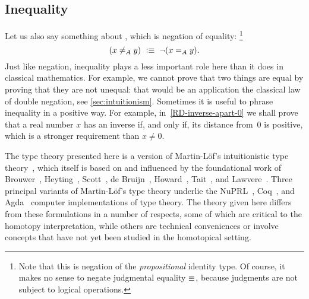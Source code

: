 \subsection{Inequality}

Let us also say something about , which is negation of equality:%
\footnote{Note that this is negation of the \emph{propositional} identity type.
Of course, it makes no sense to negate judgmental equality $\equiv$, because judgments are not subject to logical operations.}
%
\begin{equation*}
  (x \neq_A y) \ \vcentcolon\equiv\ \lnot (x =_A y).
\end{equation*}
%
Just like negation, inequality plays a less important role here than it does in classical
mathematics. For example, we cannot prove that two things are equal by proving that they
are not unequal: that would be an application the classical law of double negation, see \autoref{sec:intuitionism}.
Sometimes it is useful to phrase inequality in a positive way. For example,
in~\autoref{RD-inverse-apart-0} we shall prove that a real number $x$ has an inverse if,
and only if, its distance from~$0$ is positive, which is a stronger requirement than $x
\neq 0$.


\sectionNotes

The type theory presented here is a version of Martin-L\"{o}f's intuitionistic type theory~\cite{martinlof71itt,Martin-Lof-1972,Martin-Lof-1973,Martin-Lof-1979,martin-lof:bibliopolis}, which itself is based on and influenced by the foundational work of Brouwer~\cite{beeson}, Heyting~\cite{heyting1966intuitionism}, Scott~\cite{scott70}, de Bruijn~\cite{deBruijn-1973}, Howard~\cite{howard:pat}, Tait~\cite{Tait-1966,Tait-1968}, and Lawvere~\cite{lawvere}.  Three principal variants of Martin-L\"{o}f's type theory underlie the NuPRL~\cite{constable+86nuprl-book}, Coq~\cite{Coq}, and Agda~\cite{norell2007towards} computer implementations of type theory.  The theory given here differs from these formulations in a number of respects, some of which are critical to the homotopy interpretation, while others are technical conveniences or involve concepts that have not yet been studied in the homotopical setting.

